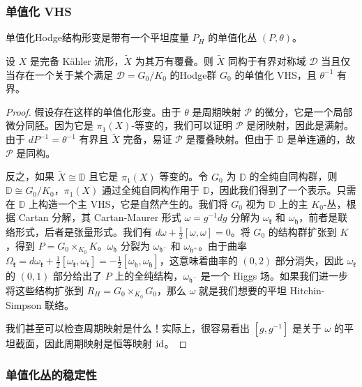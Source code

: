\subsubsection*{单值化 VHS}

单值化Hodge结构形变是带有一个平坦度量 $P_H$ 的单值化丛 $(P, \theta)$。

\begin{proposition}
设 $X$ 是完备 Kähler 流形，$\tilde{X}$ 为其万有覆叠。则 $\tilde{X}$ 同构于有界对称域 $\mathcal{D}$ 当且仅当存在一个关于某个满足 $\mathcal{D} = G_0/K_0$ 的Hodge群 $G_0$ 的单值化 VHS，且 $\theta^{-1}$ 有界。
\end{proposition}

\begin{proof}
假设存在这样的单值化形变。由于 $\theta$ 是周期映射 $\mathcal{P}$ 的微分，它是一个局部微分同胚。因为它是 $\pi_1(X)$-等变的，我们可以证明 $\mathcal{P}$ 是闭映射，因此是满射。由于 $dP^{-1} = \theta^{-1}$ 有界且 $\tilde{X}$ 完备，易证 $\mathcal{P}$ 是覆叠映射。但由于 $\mathbb{D}$ 是单连通的，故 $\mathcal{P}$ 是同构。

反之，如果 $\tilde{X} \cong \mathbb{D}$ 且它是 $\pi_1(X)$ 等变的。令 $G_0$ 为 $\mathbb{D}$ 的全纯自同构群，则 $\mathbb{D} \cong G_0/K_0$，$\pi_1(X)$ 通过全纯自同构作用于 $\mathbb{D}$，因此我们得到了一个表示。只需在 $\mathbb{D}$ 上构造一个主 VHS，它是自然产生的。我们将 $G_0$ 视为 $\mathbb{D}$ 上的主 $K_0$-丛，根据 Cartan 分解，其 Cartan-Maurer 形式 $\omega = g^{-1}dg$ 分解为 $\omega_{\mathfrak{k}}$ 和 $\omega_{\mathfrak{h}}$，前者是联络形式，后者是张量形式。我们有 $d\omega + \frac{1}{2}[\omega, \omega] = 0$。将 $G_0$ 的结构群扩张到 $K$，得到 $P = G_0 \times_{K_0} K$。$\omega_{\mathfrak{h}}$ 分裂为 $\omega_{\mathfrak{h}^-}$ 和 $\omega_{\mathfrak{h}^+}$。由于曲率 $\Omega_{\mathfrak{k}} = d\omega_{\mathfrak{k}} + \frac{1}{2}[\omega_{\mathfrak{k}}, \omega_{\mathfrak{k}}] = -\frac{1}{2}[\omega_{\mathfrak{h}}, \omega_{\mathfrak{h}}]$，这意味着曲率的 $(0,2)$ 部分消失，因此 $\omega_{\mathfrak{k}}$ 的 $(0,1)$ 部分给出了 $P$ 上的全纯结构，$\omega_{\mathfrak{h}^-}$ 是一个 Higgs 场。如果我们进一步将这些结构扩张到 $R_H = G_0 \times_{K_0} G_0$，那么 $\omega$ 就是我们想要的平坦 Hitchin-Simpson 联络。

我们甚至可以检查周期映射是什么！实际上，很容易看出 $[g, g^{-1}]$ 是关于 $\omega$ 的平坦截面，因此周期映射是恒等映射 $\mathrm{id}$。
\end{proof}

\subsubsection*{单值化丛的稳定性}

